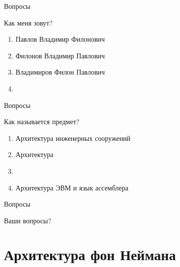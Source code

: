 \documentclass{beamer}
\begin{document}
    \begin{frame}{Вопросы}
        \begin{block}{Как меня зовут?}
            \begin{enumerate}
                \item<2-> Павлов Владимир Филонович
                \item<3-> Филонов Владимир Павлович
                \item<4-> Владимиров Филон Павлович
                \item<5-> 
            \end{enumerate}
        \end{block}
        \pause
    \end{frame}
    \begin{frame}{Вопросы}
        \begin{block}{Как называется предмет?}
            \begin{enumerate}
                \item<2-> Архитектура инженерных сооружений
                \item<3-> Архитектура 
                \item<4-> 
                \item<5-> Архитектура ЭВМ и язык ассемблера
            \end{enumerate}
        \end{block}
        \pause
    \end{frame}
    \begin{frame}{Вопросы}
    \centerline{\Huge Ваши вопросы?}
    \end{frame}

    \section{Архитектура фон Неймана}
\end{document}
